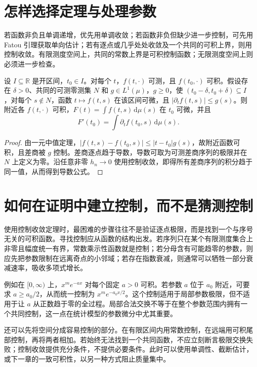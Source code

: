 \section{怎样选择定理与处理参数}
若函数非负且单调递增，优先用单调收敛；若函数非负但缺少进一步控制，可先用 Fatou 引理获取单向估计；若有逐点或几乎处处收敛及一个共同的可积上界，则用控制收敛。有限测度空间上，共同的常数上界是可积控制函数；无限测度空间上则必须进一步检查。

\begin{proposition}[一个积分号下求导的充分条件]
设 $I\subseteq\mathbb R$ 是开区间，$t_0\in I$。对每个 $t$，$f(t,\cdot)$ 可测，且 $f(t_0,\cdot)$ 可积。假设存在 $\delta>0$、共同的可测零测集 $N$ 和 $g\in L^1(\mu)$，$g\geq0$，使 $(t_0-\delta,t_0+\delta)\subseteq I$，对每个 $s\notin N$，函数 $t\mapsto f(t,s)$ 在该区间可微，且 $|\partial_tf(t,s)|\leq g(s)$。则附近各 $f(t,\cdot)$ 可积，$F(t)=\int f(t,s)\,\mathrm d\mu(s)$ 在 $t_0$ 可微，并且
\[
 F'(t_0)=\int\partial_tf(t_0,s)\,\mathrm d\mu(s).
\]
\end{proposition}
\begin{proof}
由一元中值定理，$|f(t,s)-f(t_0,s)|\leq|t-t_0|g(s)$，故附近函数可积，且差商被 $g$ 控制。差商逐点趋于导数，导数可取为可测差商序列的极限并在 $N$ 上定义为零。沿任意非零 $h_n\to0$ 使用控制收敛，即得所有差商序列的积分趋于同一值，从而得到导数公式。
\end{proof}

\section{如何在证明中建立控制，而不是猜测控制}
使用控制收敛定理时，最困难的步骤往往不是验证逐点极限，而是找到一个与序号无关的可积函数。寻找控制应从函数的结构出发。若序列只在某个有限测度集合上非零且幅度统一有界，常数乘示性函数就是控制；若分母含有可能趋零的参数，则应先把参数限制在远离奇点的小邻域；若存在指数衰减，则通常可以牺牲一部分衰减速率，吸收多项式增长。

例如在 $[0,\infty)$ 上，$x^m e^{-ax}$ 对每个固定 $a>0$ 可积。若参数 $a$ 位于 $a_0$ 附近，可要求 $a\geq a_0/2$，从而统一控制为 $x^m e^{-a_0x/2}$。这个控制适用于局部参数极限，但不适用于让 $a$ 从正数趋于零的全过程。局部合法交换不等于在整个参数范围内拥有一个共同控制，这一点在统计模型的参数微分中尤其重要。

还可以先将空间分成容易控制的部分。在有限区间内用常数控制，在远端用可积尾部控制，再将两者相加。若始终无法找到一个共同函数，不应立刻断言极限交换失败；控制收敛提供充分条件，不提供必要条件。此时可以使用单调性、截断估计，或下一章的一致可积性，以另一种方式阻止质量集中。

